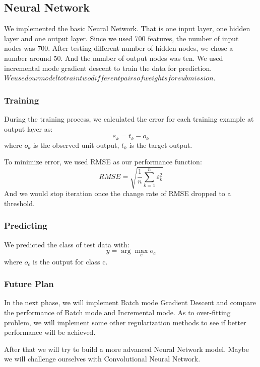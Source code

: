 \documentclass{article} %
\begin{document}
\subsection{Neural Network}
We implemented the basic Neural Network. That is one input layer, one hidden layer and one output layer. Since we used 700 features, the number of input nodes was 700. After testing different number of hidden nodes, we chose a number around 50. And the number of output nodes was ten. We  used incremental mode gradient descent to train the data for prediction.${We used our model to train two different pairs of weights for submission.}$

\subsubsection{Training}
During the training process, we calculated the error for each training example at output layer as: 
\begin{equation}
\varepsilon_{k} = t_{k} - o_{k}
\end{equation}
where $o_{k}$ is the observed unit output, $t_{k}$ is the target output.

To minimize error, we used RMSE as our performance function:
\begin{equation}
RMSE = \sqrt{\frac{1}{n}\sum_{k=1}^{n}\varepsilon_{k}^2}
\end{equation}
And we would stop iteration once the change rate of RMSE dropped to a threshold.

\subsubsection{Predicting}
We predicted the class of test data with:
\begin{equation}
y=\arg\max_{c}o_{c}
\end{equation}
where $o_{c}$ is the output for class c.

\subsubsection{Future Plan}
In the next phase, we will implement Batch mode Gradient Descent and compare the performance of Batch mode and Incremental mode. As to over-fitting problem, we will implement some other regularization methods to see if better performance will be achieved.

After that we will try to build a more advanced Neural Network model. Maybe we will challenge ourselves with Convolutional Neural Network.
\end{document}
